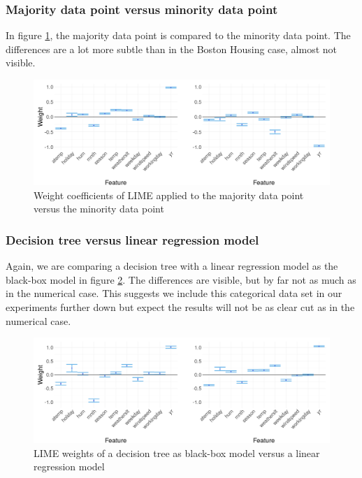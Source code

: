 \documentclass[
]{krantz}
\begin{document}
\hypertarget{majority-data-point-versus-minority-data-point}{%
\subsubsection{Majority data point versus minority data point}\label{majority-data-point-versus-minority-data-point}}

In figure \ref{fig:figmajorminor}, the majority data point is compared to the minority data point.
The differences are a lot more subtle than in the Boston Housing case, almost not visible.

\begin{figure}

{\centering \includegraphics[width=19.44in]{images/bikes_majVSmin} 

}

\caption{Weight coefficients of LIME applied to the majority data point versus the minority data point}\label{fig:figmajorminor}
\end{figure}

\hypertarget{decision-tree-versus-linear-regression-model-1}{%
\subsubsection{Decision tree versus linear regression model}\label{decision-tree-versus-linear-regression-model-1}}

Again, we are comparing a decision tree with a linear regression model as the black-box model in figure \ref{fig:figbiketreelm}.
The differences are visible, but by far not as much as in the numerical case.
This suggests we include this categorical data set in our experiments further down but expect the results will not be as clear cut as in the numerical case.

\begin{figure}

{\centering \includegraphics[width=19.44in]{images/bikes_treeVSlm} 

}

\caption{LIME weights of a decision tree as black-box model versus a linear regression model}\label{fig:figbiketreelm}
\end{figure}
\end{document}
